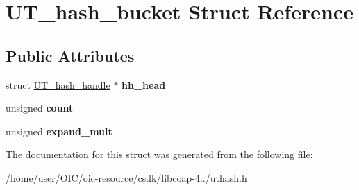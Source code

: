 \hypertarget{structUT__hash__bucket}{}\section{U\+T\+\_\+hash\+\_\+bucket Struct Reference}
\label{structUT__hash__bucket}
\subsection*{Public Attributes}
\begin{DoxyCompactItemize}
\item 
\hypertarget{structUT__hash__bucket_a785a785132212378bb28fb4341cfecaf}{}struct \hyperlink{structUT__hash__handle}{U\+T\+\_\+hash\+\_\+handle} $\ast$ {\bfseries hh\+\_\+head}\label{structUT__hash__bucket_a785a785132212378bb28fb4341cfecaf}

\item 
\hypertarget{structUT__hash__bucket_a5d20cc12bdcbde360398910eefb45634}{}unsigned {\bfseries count}\label{structUT__hash__bucket_a5d20cc12bdcbde360398910eefb45634}

\item 
\hypertarget{structUT__hash__bucket_a9b739c1b69c141e8198c0c64af643b2b}{}unsigned {\bfseries expand\+\_\+mult}\label{structUT__hash__bucket_a9b739c1b69c141e8198c0c64af643b2b}

\end{DoxyCompactItemize}


The documentation for this struct was generated from the following file\+:\begin{DoxyCompactItemize}
\item 
/home/user/\+O\+I\+C/oic-\/resource/csdk/libcoap-\/4../uthash.\+h\end{DoxyCompactItemize}
